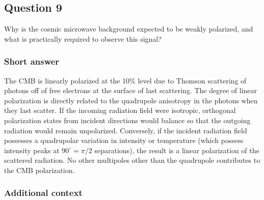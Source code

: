 \documentclass[a4paper,11pt]{article}
\begin{document}
\newpage
\subsection{Question 9}

Why is the cosmic microwave background expected to be weakly polarized, and what is practically required to observe this signal?

\subsubsection{Short answer}

The CMB is linearly polarized at the 10\% level due to Thomson scattering of photons off of free electrons at the surface of last scattering.  The degree of linear polarization is directly related to the quadrupole anisotropy in the photons when they last scatter. If the incoming radiation field were isotropic, orthogonal polarization states from incident directions would balance so that the outgoing radiation would remain unpolarized. Conversely, if the incident radiation field possesses a quadrupolar variation in intensity or temperature (which possess intensity peaks at $90^\circ=\pi/2$ separations), the result is a linear polarization of the scattered radiation. No other multipoles other than the quadrupole contributes to the CMB polarization.

\subsubsection{Additional context}
\end{document}
